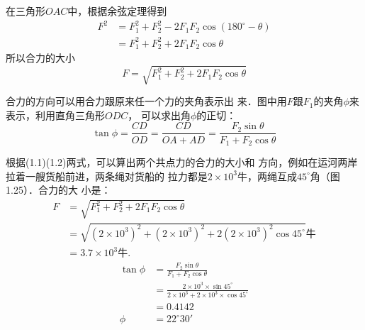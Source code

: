 \begin{figure}[htp]
\centering
{}
\caption{}
\end{figure}


    在三角形$OAC$中，根据余弦定理得到
\[\begin{split}
F^2 & = F_1^2+F_2^2-2F_1F_2\cos(180^\circ -\theta)  \\
&= F_1^2+F_2^2+2F_1F_2\cos\theta
\end{split} \]
所以合力的大小
\begin{equation}
F=\sqrt{F_1^2+F_2^2+2F_1F_2\cos\theta}
\end{equation}

    合力的方向可以用合力跟原来任一个力的夹角表示出
来．图中用$F$跟$F_1$的夹角$\phi$来表示，利用直角三角形$ODC$，
可以求出角$\phi$的正切：
\begin{equation}
\tan\phi =\frac{CD}{OD}=\frac{CD}{OA+AD}=\frac{F_2\sin\theta }{F_1+F_2\cos\theta}
\end{equation}




    根据(1.1)(1.2)两式，可以算出两个共点力的合力的大小和
方向，例如在运河两岸拉着一艘货船前进，两条绳对货船的
拉力都是$2\times 10^3$牛，两绳互成$45^\circ$角（图1.25）．合力的大
小是：
\[\begin{split}
F&= \sqrt{F_1^2+F_2^2+2F_1F_2\cos\theta}\\
&=\sqrt{(2\times 10^3)^2+(2\times 10^3)^2+2(2\times 10^3)^2\cos 45^{\circ}}\text{牛}\\
&=3.7\times 10^3\text{牛.}
\end{split} \]
\[\begin{split}
\tan\phi&= \frac{F_2\sin\theta }{F_1+F_2\cos\theta}\\
&= \frac{2\times 10^3\times \sin 45^{\circ}}{2\times 10^3+2\times 10^3\times \cos 45^{\circ}}  \\
&=0.4142\\
\phi &= 22^{\circ} 30'
\end{split} \]

